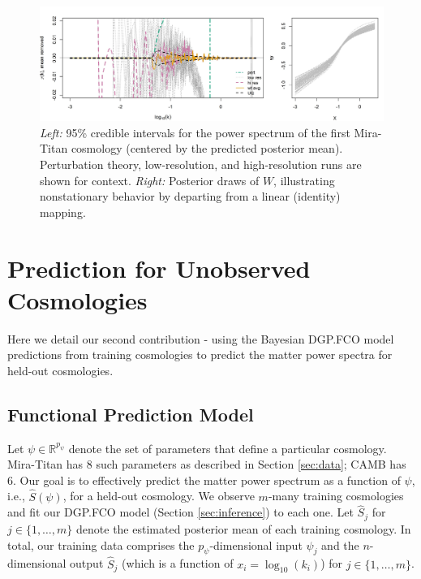 \documentclass[11pt]{article}
\begin{document}
\begin{figure}[ht]
    \centering
    \includegraphics[width=6in]{plot_fit.jpeg}
    \caption{{\it Left:} 95\% credible intervals for the power spectrum of the first Mira-Titan
    cosmology (centered by the predicted posterior mean). Perturbation theory, 
    low-resolution, and high-resolution runs are shown for context. {\it Right:} Posterior draws
    of $W$, illustrating nonstationary behavior by departing from a linear (identity) mapping.}
    \label{fig:plot_fit}
\end{figure}

\section{Prediction for Unobserved Cosmologies}
\label{sec:pred}

Here we detail our second contribution - using the Bayesian DGP.FCO model predictions
from training cosmologies to predict the matter power spectra for held-out cosmologies. 

\subsection{Functional Prediction Model}
\label{subsec:pca}

Let $\psi \in \mathbb{R}^{p_\psi}$ denote the set of parameters that define a particular cosmology.
Mira-Titan has 8 such parameters as described in Section \ref{sec:data}; CAMB has 6.
Our goal is to effectively predict the matter power spectrum as a function of $\psi$, i.e., $\hat{S}(\psi)$, 
for a held-out cosmology.  We observe $m$-many training cosmologies and fit our DGP.FCO 
model (Section \ref{sec:inference}) to each one.  Let $\hat{S}_j$ for $j \in \{1,\ldots,m\}$ denote
the estimated posterior mean of each training cosmology.  In total, our training data comprises
the $p_\psi$-dimensional input $\psi_j$ and the $n$-dimensional output $\hat{S}_j$ (which is a 
function of $x_i = \log_{10}(k_i)$) for $j \in \{1,\ldots,m\}$.
\end{document}
